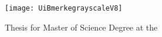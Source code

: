 \begin{titlepage}

    \begin{center} 

    

    {\linespread{1.1}\Huge\textbf {\thetitle}\par}
    
    \vspace{8ex}
    
    {\Large{\textbf \theauthor} %
    
    \texttt{[image: UiBmerkegrayscaleV8]}
    
    Thesis for Master of Science Degree at the \University \vfill
    
    \thedate 
    \vfill
    }
    \end{center} 

\end{titlepage}

